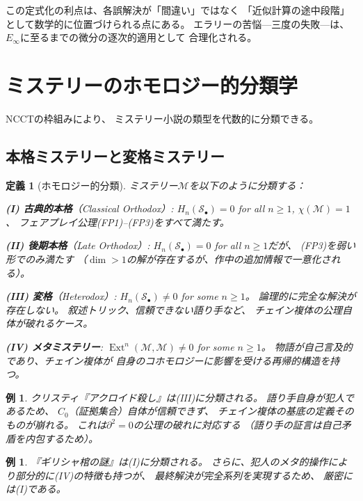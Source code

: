 \documentclass[12pt,twocolumn]{ltjsarticle}
\newtheorem{definition}[theorem]{定義}
\newtheorem{example}[theorem]{例}
\newcommand{\Ext}{\operatorname{Ext}}
\newcommand{\Mys}{\mathcal{M}}
\newcommand{\Sol}{\mathcal{S}}
\begin{document}
この定式化の利点は、各誤解決が「間違い」ではなく
「近似計算の途中段階」として数学的に位置づけられる点にある。
エラリーの苦悩---三度の失敗---は、
$E_\infty$に至るまでの微分の逐次的適用として
合理化される。


\section{ミステリーのホモロジー的分類学}
\label{sec:taxonomy}

NCCTの枠組みにより、
ミステリー小説の類型を代数的に分類できる。

\subsection{本格ミステリーと変格ミステリー}

\begin{definition}[ホモロジー的分類]
ミステリー$\Mys$を以下のように分類する：

\textbf{(I) 古典的本格}（Classical Orthodox）:
$H_n(\Sol_\bullet) = 0$ for all $n \geq 1$,
$\chi(\Mys) = 1$、
フェアプレイ公理(FP1)--(FP3)をすべて満たす。

\textbf{(II) 後期本格}（Late Orthodox）:
$H_n(\Sol_\bullet) = 0$ for all $n \geq 1$だが、
(FP3)を弱い形でのみ満たす
（$\dim > 1$の解が存在するが、作中の追加情報で一意化される）。

\textbf{(III) 変格}（Heterodox）:
$H_n(\Sol_\bullet) \neq 0$ for some $n \geq 1$。
論理的に完全な解決が存在しない。
叙述トリック、信頼できない語り手など、
チェイン複体の公理自体が破れるケース。

\textbf{(IV) メタミステリー}:
$\Ext^n(\Mys, \Mys) \neq 0$ for some $n \geq 1$。
物語が自己言及的であり、チェイン複体が
自身のコホモロジーに影響を受ける再帰的構造を持つ。
\end{definition}

\begin{example}
クリスティ『アクロイド殺し』は(III)に分類される。
語り手自身が犯人であるため、
$C_0$（証拠集合）自体が信頼できず、
チェイン複体の基底の定義そのものが崩れる。
これは$\partial^2 = 0$の公理の破れに対応する
（語り手の証言は自己矛盾を内包するため）。
\end{example}

\begin{example}
『ギリシャ棺の謎』は(I)に分類される。
さらに、犯人のメタ的操作により部分的に(IV)の特徴も持つが、
最終解決が完全系列を実現するため、
厳密には(I)である。
\end{example}
\end{document}
